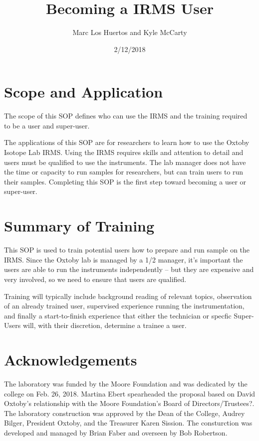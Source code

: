 \documentclass[12pt]{../SOP3_beta}\usepackage[]{graphicx}\usepackage[]{color}
\title{Becoming a IRMS User}
\date{2/12/2018}
\author{Marc Los Huertos and Kyle McCarty}
\begin{document}
\maketitle

\section{Scope and Application}

\NP The scope of this SOP defines who can use the IRMS and the training required to be a user and super-user.

\NP The applications of this SOP are for researchers to learn how to use the Oxtoby Isotope Lab IRMS. Using the IRMS requires skills and attention to detail and users must be qualified to use the instruments. The lab manager does not have the time or capacity to run samples for researchers, but can train users to run their samples. Completing this SOP is the first step toward becoming a user or super-user.

\section{Summary of Training}

\NP This SOP is used to train potential users how to prepare and run sample on the IRMS. Since the Oxtoby lab is managed by a 1/2 manager, it's important the users are able to run the instruments independently -- but they are expensive and very involved, so we need to ensure that users are qualified.

\NP Training will typically include background reading of relevant topics, observation of an already trained user, supervised experience running the instrumentation, and finally a start-to-finish experience that either the technician or specfic Super-Users will, with their discretion, determine a trainee a user.

\newpage

\tableofcontents


\newpage
\section{Acknowledgements}

The laboratory was funded by the Moore Foundation and was dedicated by the college on Feb. 26, 2018. Martina Ebert spearheaded the proposal based on David Oxtoby's relationship with the Moore Foundation's Board of Directors/Trustees?. The laboratory construction was approved by the Dean of the College, Audrey Bilger, President Oxtoby, and the Treasurer Karen Sission. The consturction was developed and managed by Brian Faber and overseen by Bob Robertson.
\end{document}

